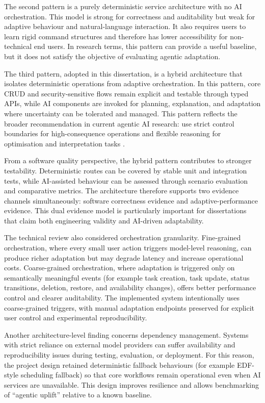 \documentclass[12pt]{article}
\begin{document}
The second pattern is a purely deterministic service architecture with no AI orchestration. This model is strong for correctness and auditability but weak for adaptive behaviour and natural-language interaction. It also requires users to learn rigid command structures and therefore has lower accessibility for non-technical end users. In research terms, this pattern can provide a useful baseline, but it does not satisfy the objective of evaluating agentic adaptation.

The third pattern, adopted in this dissertation, is a hybrid architecture that isolates deterministic operations from adaptive orchestration. In this pattern, core CRUD and security-sensitive flows remain explicit and testable through typed APIs, while AI components are invoked for planning, explanation, and adaptation where uncertainty can be tolerated and managed. This pattern reflects the broader recommendation in current agentic AI research: use strict control boundaries for high-consequence operations and flexible reasoning for optimisation and interpretation tasks \parencite{shavit2023practices}.

From a software quality perspective, the hybrid pattern contributes to stronger testability. Deterministic routes can be covered by stable unit and integration tests, while AI-assisted behaviour can be assessed through scenario evaluation and comparative metrics. The architecture therefore supports two evidence channels simultaneously: software correctness evidence and adaptive-performance evidence. This dual evidence model is particularly important for dissertations that claim both engineering validity and AI-driven adaptability.

The technical review also considered orchestration granularity. Fine-grained orchestration, where every small user action triggers model-level reasoning, can produce richer adaptation but may degrade latency and increase operational costs. Coarse-grained orchestration, where adaptation is triggered only on semantically meaningful events (for example task creation, task update, status transitions, deletion, restore, and availability changes), offers better performance control and clearer auditability. The implemented system intentionally uses coarse-grained triggers, with manual adaptation endpoints preserved for explicit user control and experimental reproducibility.

Another architecture-level finding concerns dependency management. Systems with strict reliance on external model providers can suffer availability and reproducibility issues during testing, evaluation, or deployment. For this reason, the project design retained deterministic fallback behaviours (for example EDF-style scheduling fallback) so that core workflows remain operational even when AI services are unavailable. This design improves resilience and allows benchmarking of ``agentic uplift'' relative to a known baseline.
\end{document}
